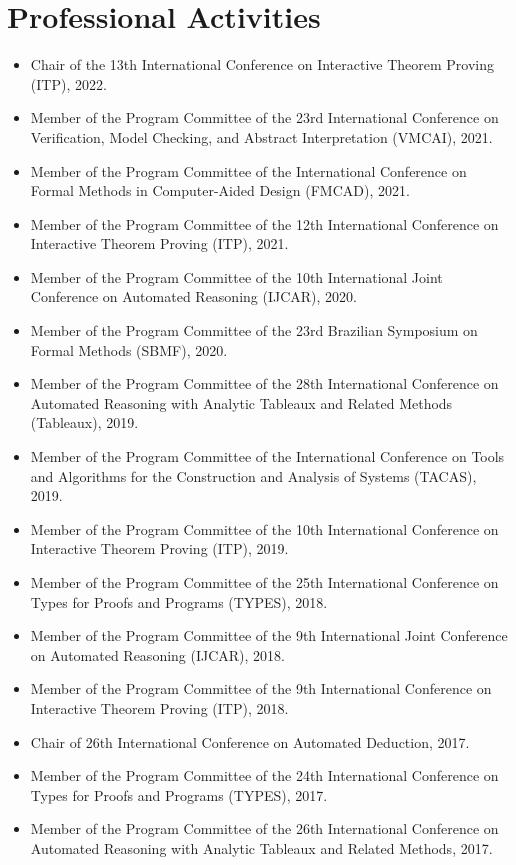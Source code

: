 \documentclass{article}
\begin{document}
\section*{Professional Activities}
\begin{itemize}
\item Chair of the 13th International Conference on Interactive Theorem Proving (ITP), 2022.
\item Member of the Program Committee of the 23rd International Conference on Verification, Model Checking, and Abstract Interpretation (VMCAI), 2021.
\item Member of the Program Committee of the International Conference on Formal Methods in Computer-Aided Design (FMCAD), 2021.
\item Member of the Program Committee of the 12th International Conference on Interactive Theorem Proving (ITP), 2021.
\item Member of the Program Committee of the 10th International Joint Conference on Automated Reasoning (IJCAR), 2020.
\item Member of the Program Committee of the 23rd Brazilian Symposium on Formal Methods (SBMF), 2020.
\item Member of the Program Committee of the 28th International Conference on Automated Reasoning with Analytic Tableaux and Related Methods (Tableaux), 2019.
\item Member of the Program Committee of the International Conference on Tools and Algorithms for the Construction and Analysis of Systems (TACAS), 2019.
\item Member of the Program Committee of the 10th International Conference on Interactive Theorem Proving (ITP), 2019.
\item Member of the Program Committee of the 25th International Conference on Types for Proofs and Programs (TYPES), 2018.
\item Member of the Program Committee of the 9th International Joint Conference on Automated Reasoning (IJCAR), 2018.
\item Member of the Program Committee of the 9th International Conference on Interactive Theorem Proving (ITP), 2018.
\item Chair of 26th International Conference on Automated Deduction, 2017.
\item Member of the Program Committee of the 24th International Conference on Types for Proofs and Programs (TYPES), 2017.
\item Member of the Program Committee of the 26th International Conference on Automated Reasoning with Analytic Tableaux and Related Methods, 2017.

\end{itemize}
\end{document}
